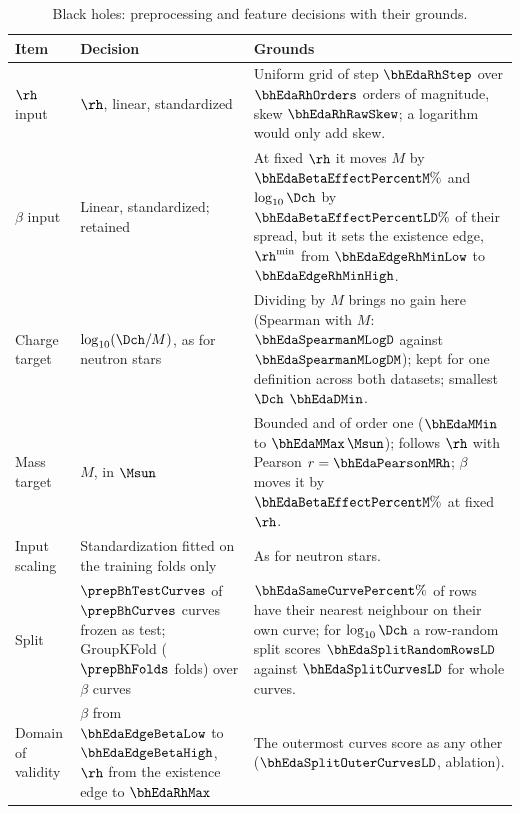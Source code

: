 \begin{table}[!htb]
\centering
\caption{Black holes: preprocessing and feature decisions with their grounds.}
\label{tab:decisions-bh}
\renewcommand{\arraystretch}{1.2}
\small
\begin{tabular}{p{2.4cm} p{3.6cm} p{5.3cm}}
\toprule
Item & Decision & Grounds \\
\midrule
$\rh$ input & $\rh$, linear, standardized &
Uniform grid of step $\bhEdaRhStep$ over $\bhEdaRhOrders$ orders of magnitude, skew $\bhEdaRhRawSkew$; a logarithm would only add skew. \\
$\beta$ input & Linear, standardized; retained &
At fixed $\rh$ it moves $M$ by $\bhEdaBetaEffectPercentM\%$ and $\log_{10}\Dch$ by $\bhEdaBetaEffectPercentLD\%$ of their spread, but it sets the existence edge, $\rh^{\min}$ from $\bhEdaEdgeRhMinLow$ to $\bhEdaEdgeRhMinHigh$. \\
Charge target & $\log_{10}(\Dch/M)$, as for neutron stars &
Dividing by $M$ brings no gain here (Spearman with $M$: $\bhEdaSpearmanMLogD$ against $\bhEdaSpearmanMLogDM$); kept for one definition across both datasets; smallest $\Dch$ $\bhEdaDMin$. \\
Mass target & $M$, in $\Msun$ &
Bounded and of order one ($\bhEdaMMin$ to $\bhEdaMMax\,\Msun$); follows $\rh$ with Pearson $r = \bhEdaPearsonMRh$; $\beta$ moves it by $\bhEdaBetaEffectPercentM\%$ at fixed $\rh$. \\
Input scaling & Standardization fitted on the training folds only &
As for neutron stars. \\
Split & $\prepBhTestCurves$ of $\prepBhCurves$ curves frozen as test; GroupKFold ($\prepBhFolds$ folds) over $\beta$ curves &
$\bhEdaSameCurvePercent\%$ of rows have their nearest neighbour on their own curve; for $\log_{10}\Dch$ a row-random split scores $\bhEdaSplitRandomRowsLD$ against $\bhEdaSplitCurvesLD$ for whole curves. \\
Domain of validity & $\beta$ from $\bhEdaEdgeBetaLow$ to $\bhEdaEdgeBetaHigh$, $\rh$ from the existence edge to $\bhEdaRhMax$ &
The outermost curves score as any other ($\bhEdaSplitOuterCurvesLD$, ablation). \\
\bottomrule
\end{tabular}
\end{table}
